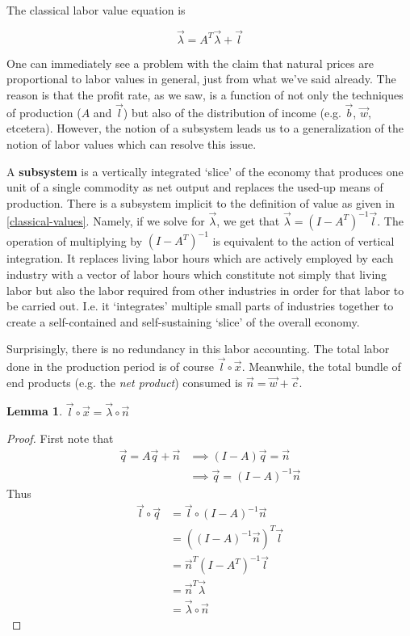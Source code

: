 \documentclass{article}
\theoremstyle{definition}
\newtheorem{lemma}{Lemma}[section]
\begin{document}
The classical labor value equation is

\begin{equation}\label{classical-values}
    \vec{\lambda} = A^T\vec{\lambda}+\vec{l}
\end{equation}

One can immediately see a problem with the claim that natural prices are proportional to labor values in general, just from what we've said already. The reason is that the profit rate, as we saw, is a function of not only the techniques of production ($A$ and $\vec{l}$) but also of the distribution of income (e.g. $\vec{b}$, $\vec{w}$, etcetera). However, the notion of a subsystem leads us to a generalization of the notion of labor values which can resolve this issue.

A \textbf{subsystem} is a vertically integrated `slice' of the economy that produces one unit of a single commodity as net output and replaces the used-up means of production. There is a subsystem implicit to the definition of value as given in \ref{classical-values}. Namely, if we solve for $\vec{\lambda}$, we get that $\vec{\lambda} = (I-A^T)^{-1}\vec{l}$. The operation of multiplying by $(I-A^T)^{-1}$ is equivalent to the action of vertical integration. It replaces living labor hours which are actively employed by each industry with a vector of labor hours which constitute not simply that living labor but also the labor required from other industries in order for that labor to be carried out. I.e. it `integrates' multiple small parts of industries together to create a self-contained and self-sustaining `slice' of the overall economy. 

Surprisingly, there is no redundancy in this labor accounting. The total labor done in the production period is of course $\vec{l}\circ \vec{x}$. Meanwhile, the total bundle of end products (e.g. the \emph{net product}) consumed is $\vec{n} = \vec{w}+\vec{c}$. 

\begin{lemma}
    $\vec{l}\circ \vec{x} = \vec{\lambda}\circ \vec{n}$
\end{lemma}
\begin{proof}
    First note that 
    \begin{align}
        \vec{q} = A\vec{q}+\vec{n} &\implies (I-A)\vec{q} = \vec{n} \\ &\implies \vec{q} = (I-A)^{-1}\vec{n}
    \end{align}
    Thus
    \begin{align}
        \vec{l}\circ\vec{q} &= \vec{l}\circ (I-A)^{-1}\vec{n} \\
                            &= ((I-A)^{-1}\vec{n})^T\vec{l} \\
                            &= \vec{n}^T(I-A^T)^{-1}\vec{l} \\
                            &= \vec{n}^T \vec{\lambda} \\
                            &= \vec{\lambda} \circ \vec{n}
    \end{align}
\end{proof}
\end{document}
